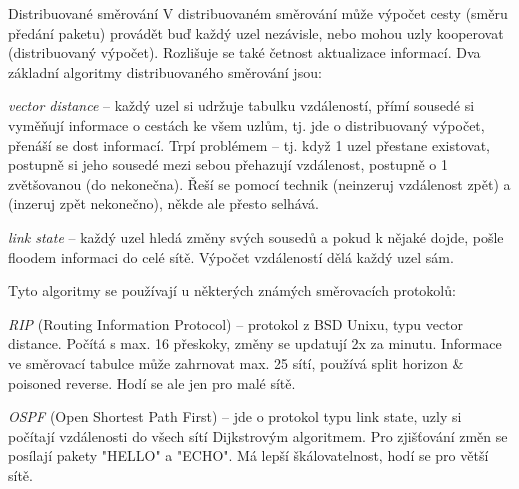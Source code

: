 \medskip
\begin{obecne}{Distribuované směrování}
V distribuovaném směrování může výpočet cesty (směru předání paketu) provádět buď každý uzel nezávisle, nebo mohou uzly kooperovat (distribuovaný výpočet). Rozlišuje se také četnost aktualizace informací. Dva základní algoritmy distribuovaného směrování jsou:
\begin{pitemize}
    \item \emph{vector distance} -- každý uzel si udržuje tabulku vzdáleností, přímí sousedé si vyměňují informace o cestách ke všem uzlům, tj. jde o distribuovaný výpočet, přenáší se dost informací. Trpí problémem  -- tj. když 1 uzel přestane existovat, postupně si jeho sousedé mezi sebou přehazují vzdálenost, postupně o 1 zvětšovanou (do nekonečna). Řeší se pomocí technik  (neinzeruj vzdálenost zpět) a  (inzeruj zpět nekonečno), někde ale přesto selhává.
    \item \emph{link state} -- každý uzel hledá změny svých sousedů a pokud k nějaké dojde, pošle floodem informaci do celé sítě. Výpočet vzdáleností dělá každý uzel sám.
\end{pitemize}
Tyto algoritmy se používají u některých známých směrovacích protokolů:
\begin{pitemize}
    \item \emph{RIP} (Routing Information Protocol) -- protokol z BSD Unixu, typu vector distance. Počítá s max. 16 přeskoky, změny se updatují 2x za minutu. Informace ve směrovací tabulce může zahrnovat max. 25 sítí, používá split horizon \& poisoned reverse. Hodí se ale jen pro malé sítě.
    \item \emph{OSPF} (Open Shortest Path First) -- jde o protokol typu link state, uzly si počítají vzdálenosti do všech sítí Dijkstrovým algoritmem. Pro zjišťování změn se posílají pakety "HELLO" a "ECHO". Má lepší škálovatelnost, hodí se pro větší sítě.
\end{pitemize}
\end{obecne}

